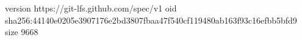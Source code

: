 version https://git-lfs.github.com/spec/v1
oid sha256:44140e0205e3907176e2bd3807fbaa47f540cf119480ab163f93c16efbb5bfd9
size 9668
